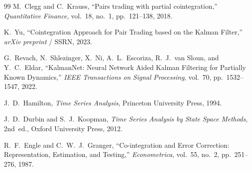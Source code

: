 \documentclass[11pt, a4paper]{article}
\begin{document}
\begin{thebibliography}{99}
M.~Clegg and C.~Krauss, ``Pairs trading with partial cointegration,'' \textit{Quantitative Finance}, vol.~18, no.~1, pp.~121--138, 2018.

K.~Yu, ``Cointegration Approach for Pair Trading based on the Kalman Filter,'' \textit{arXiv preprint} / SSRN, 2023.

G.~Revach, N.~Shlezinger, X.~Ni, A.~L.~Escoriza, R.~J.~van Sloun, and Y.~C.~Eldar, ``KalmanNet: Neural Network Aided Kalman Filtering for Partially Known Dynamics,'' \textit{IEEE Transactions on Signal Processing}, vol.~70, pp.~1532--1547, 2022.

J.~D.~Hamilton, \textit{Time Series Analysis}, Princeton University Press, 1994.

J.~D.~Durbin and S.~J.~Koopman, \textit{Time Series Analysis by State Space Methods}, 2nd~ed., Oxford University Press, 2012.

R.~F.~Engle and C.~W.~J.~Granger, ``Co-integration and Error Correction: Representation, Estimation, and Testing,'' \textit{Econometrica}, vol.~55, no.~2, pp.~251--276, 1987.

\end{thebibliography}
\end{document}
